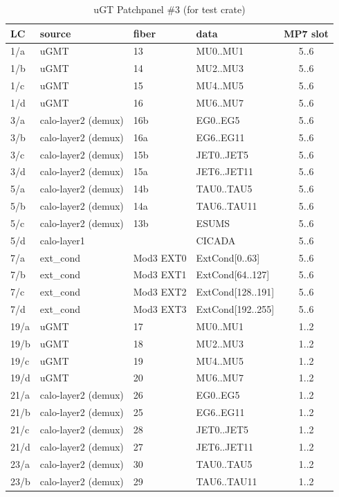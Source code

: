 \begin{longtable}{|l|l|l|l|c|}
\caption{uGT Patchpanel \#3 (for test crate)}
    \label{tab:app:opt_pp_tab_3}\\
\hline
\textbf{LC} & \textbf{source} & \textbf{fiber} & \textbf{data} & \textbf{MP7 slot}\\
\hline
\hline
\endhead
1/a & uGMT & 13 & MU0..MU1 & 5..6\\
1/b & uGMT & 14 & MU2..MU3 & 5..6\\
1/c & uGMT & 15 & MU4..MU5 & 5..6\\
1/d & uGMT & 16 & MU6..MU7 & 5..6\\
3/a & calo-layer2 (demux) & 16b & EG0..EG5 & 5..6\\
3/b & calo-layer2 (demux) & 16a & EG6..EG11 & 5..6\\
3/c & calo-layer2 (demux) & 15b & JET0..JET5 & 5..6\\
3/d & calo-layer2 (demux) & 15a & JET6..JET11 & 5..6\\
5/a & calo-layer2 (demux) & 14b & TAU0..TAU5 & 5..6\\
5/b & calo-layer2 (demux) & 14a & TAU6..TAU11 & 5..6\\
5/c & calo-layer2 (demux) & 13b & ESUMS & 5..6\\
5/d & calo-layer1 &  & CICADA & 5..6\\
7/a & ext\_cond & Mod3 EXT0 & ExtCond[0..63] & 5..6 \\
7/b & ext\_cond & Mod3 EXT1 & ExtCond[64..127] & 5..6\\
7/c & ext\_cond & Mod3 EXT2 & ExtCond[128..191] & 5..6\\
7/d & ext\_cond & Mod3 EXT3 & ExtCond[192..255] & 5..6\\\hline
19/a & uGMT & 17 & MU0..MU1 & 1..2\\
19/b & uGMT & 18 & MU2..MU3 & 1..2\\
19/c & uGMT & 19 & MU4..MU5 & 1..2\\
19/d & uGMT & 20 & MU6..MU7 & 1..2\\
21/a & calo-layer2 (demux) & 26 & EG0..EG5 & 1..2\\
21/b & calo-layer2 (demux) & 25 & EG6..EG11 & 1..2\\
21/c & calo-layer2 (demux) & 28 & JET0..JET5 & 1..2\\
21/d & calo-layer2 (demux) & 27 & JET6..JET11 & 1..2\\
23/a & calo-layer2 (demux) & 30 & TAU0..TAU5 & 1..2\\
23/b & calo-layer2 (demux) & 29 & TAU6..TAU11 & 1..2\\

\end{longtable}
